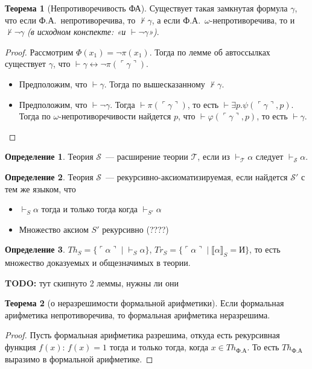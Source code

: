 \documentclass[a4paper,11pt]{article}
\theoremstyle{definition}
\newtheorem*{thm}{Теорема}
\newtheorem*{dfn}{Определение}
\newcommand{\proves}{\vdash}
\newcommand{\True}{\text{И}}
\newcommand{\gn}[1]{\ulcorner #1 \urcorner}
\newcommand{\todo}[1]{\textbf{TODO:} #1}
\begin{document}
\begin{thm}[Непротиворечивость ФА]
Существует такая замкнутая формула $\gamma$, что если Ф.А.\ непротиворечива, то
$\nvdash \gamma$, а если Ф.А.\ $\omega$-непротиворечива, то и $\nvdash
\neg\gamma$ \emph{(в исходном конспекте: «и $\proves \neg\gamma$»)}.
\end{thm}
\begin{proof}
Рассмотрим $\Phi(x_1) = \neg\pi(x_1)$. Тогда по лемме об автоссылках существует
$\gamma$, что $\proves \gamma \leftrightarrow \neg\pi(\gn{\gamma})$.
\begin{itemize}
\item Предположим, что $\proves \gamma$. Тогда по вышесказанному $\nvdash
  \gamma$.
\item Предположим, что $\proves \neg\gamma$. Тогда $\proves \pi(\gn{\gamma})$,
  то есть $\proves \exists p.\psi(\gn{\gamma}, p)$. Тогда по
  $\omega$-непротиворечивости найдется $p$, что $\proves \varphi(\gn{\gamma},
  p)$, то есть $\proves \gamma$.
\end{itemize}
\end{proof}
\begin{dfn}
Теория $\mathcal{S}$~--- расширение теории $\mathcal{T}$, если из $\proves_{\mathcal{T}}
\alpha$ следует $\proves_{\mathcal{S}} \alpha$.
\end{dfn}
\begin{dfn}
Теория $\mathcal{S}$~--- рекурсивно-аксиоматизируемая, если найдется
$\mathcal{S}'$ с тем же языком, что
\begin{itemize}
\item $\proves_S \alpha$ тогда и только тогда когда $\proves_{S'} \alpha$
\item Множество аксиом $S'$ рекурсивно (????)
\end{itemize}
\end{dfn}
\begin{dfn}
$Th_S = \{\gn{\alpha} \mid \proves_S \alpha\}$, $Tr_S = \{\gn{\alpha} \mid
\llbracket\alpha\rrbracket_S = \True\}$, то есть множество доказуемых и
общезначимых в теории.
\end{dfn}
\todo{тут скипнуто 2 леммы, нужны ли они}

\begin{thm}[о неразрешимости формальной арифметики]
Если формальная арифметика непротиворечива, то формальная арифметика
неразрешима.
\end{thm}
\begin{proof}
Пусть формальная арифметика разрешима, откуда есть рекурсивная функция $f(x)$:
$f(x) = 1$ тогда и только тогда, когда $x \in Th_{\text{Ф.А}}$. То есть
$Th_{\text{Ф.А}}$ выразимо в формальной арифметике.
\end{proof}
\end{document}
